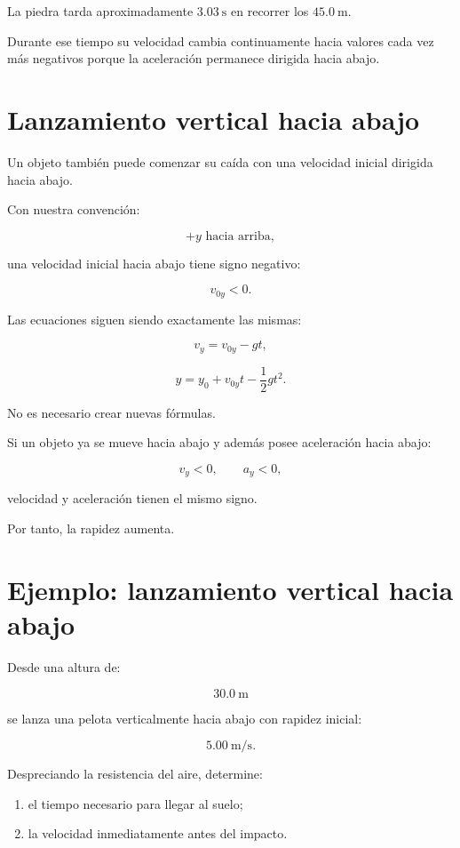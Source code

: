 \begin{interpretacion}
La piedra tarda aproximadamente \(\SI{3.03}{\second}\) en recorrer los \(\SI{45.0}{\meter}\).

Durante ese tiempo su velocidad cambia continuamente hacia valores cada vez más negativos porque la aceleración permanece dirigida hacia abajo.
\end{interpretacion}


\section{Lanzamiento vertical hacia abajo}

Un objeto también puede comenzar su caída con una velocidad inicial dirigida hacia abajo.

Con nuestra convención:

\[ +y\text{ hacia arriba}, \]

una velocidad inicial hacia abajo tiene signo negativo:

\[ v_{0y}<0. \]

Las ecuaciones siguen siendo exactamente las mismas:

\[ v_y=v_{0y}-gt, \]

\[ y=y_0+v_{0y}t-\frac{1}{2}gt^2. \]

No es necesario crear nuevas fórmulas.


\begin{interpretacion}
Si un objeto ya se mueve hacia abajo y además posee aceleración hacia abajo:

\[
v_y<0,
\qquad
a_y<0,
\]

velocidad y aceleración tienen el mismo signo.

Por tanto, la rapidez aumenta.
\end{interpretacion}


\section{Ejemplo: lanzamiento vertical hacia abajo}

\begin{ejemplo}
Desde una altura de:

\[ \SI{30.0}{\meter} \]

se lanza una pelota verticalmente hacia abajo con rapidez inicial:

\[ \SI{5.00}{\meter\per\second}. \]

Despreciando la resistencia del aire, determine:

\begin{enumerate}[label=\alph*)]
    \item el tiempo necesario para llegar al suelo;
    \item la velocidad inmediatamente antes del impacto.
\end{enumerate}
\end{ejemplo}


